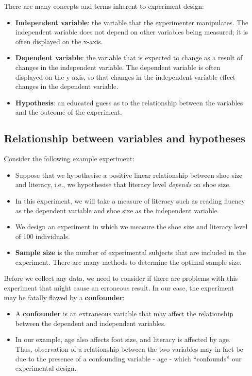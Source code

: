\documentclass[10pt,a4paper,twoside]{article}\usepackage[]{graphicx}\usepackage[]{xcolor}
\begin{document}
There are many concepts and terms inherent to experiment design:

\begin{itemize}
  \item \textbf{Independent variable}: the variable that the experimenter manipulates. The independent variable does not depend on other variables being measured; it is often displayed on the x-axis.
  \item \textbf{Dependent variable}: the variable that is expected to change as a result of changes in the independent variable. The dependent variable is often displayed on the y-axis, so that changes in the independent variable effect changes in the dependent variable.
  \item \textbf{Hypothesis}: an educated guess as to the relationship between the variables and the outcome of the experiment.
\end{itemize}

\subsection{Relationship between variables and hypotheses}

Consider the following example experiment:

\begin{itemize}
  \item Suppose that we hypothesise a positive linear relationship between shoe size and literacy, i.e., we hypothesise that literacy level \emph{depends} on shoe size.
  \item In this experiment, we will take a measure of literacy such as reading fluency as the dependent variable and shoe size as the independent variable.
  \item We design an experiment in which we measure the shoe size and literacy level of 100 individuals.
  \item \textbf{Sample size} is the number of experimental subjects that are included in the experiment. There are many methods to determine the optimal sample size.
\end{itemize}

Before we collect any data, we need to consider if there are problems with this experiment that might cause an erroneous result. In our case, the experiment may be fatally flawed by a \textbf{confounder}:

\begin{itemize}
  \item A \textbf{confounder} is an extraneous variable that may affect the relationship between the dependent and independent variables.
  \item In our example, age also affects foot size, and literacy is affected by age. Thus, observation of a relationship between the two variables may in fact be due to the presence of a confounding variable - age - which ``confounds'' our experimental design.
\end{itemize}
\end{document}
